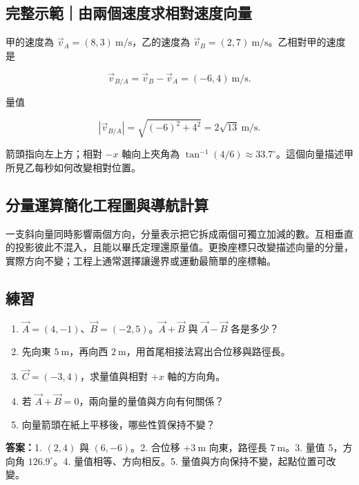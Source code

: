 \documentclass[11pt,a4paper]{article}
\providecommand{\tightlist}{%
  \setlength{\itemsep}{0pt}\setlength{\parskip}{0pt}}
\begin{document}
\begin{HandoutWorkedExample}

\subsection{完整示範｜由兩個速度求相對速度向量}\label{ux5b8cux6574ux793aux7bc4ux7531ux5169ux500bux901fux5ea6ux6c42ux76f8ux5c0dux901fux5ea6ux5411ux91cf}

甲的速度為 \(\vec v_A=(8,3)\ \mathrm{m/s}\)，乙的速度為 \(\vec v_B=(2,7)\ \mathrm{m/s}\)。乙相對甲的速度是

\[
\vec v_{B/A}=\vec v_B-\vec v_A=(-6,4)\ \mathrm{m/s}.
\]

量值

\[
|\vec v_{B/A}|=\sqrt{(-6)^2+4^2}=2\sqrt{13}\ \mathrm{m/s}.
\]

箭頭指向左上方；相對 \(-x\) 軸向上夾角為 \(\tan^{-1}(4/6)\approx33.7^\circ\)。這個向量描述甲所見乙每秒如何改變相對位置。

\end{HandoutWorkedExample}

\subsection{分量運算簡化工程圖與導航計算}\label{ux5206ux91cfux904bux7b97ux7c21ux5316ux5de5ux7a0bux5716ux8207ux5c0eux822aux8a08ux7b97}

一支斜向量同時影響兩個方向，分量表示把它拆成兩個可獨立加減的數。互相垂直的投影彼此不混入，且能以畢氏定理還原量值。更換座標只改變描述向量的分量，實際方向不變；工程上通常選擇讓邊界或運動最簡單的座標軸。

\begin{HandoutSelfCheck}

\subsection{練習}\label{ux7df4ux7fd2-1}

\begin{enumerate}
\def\labelenumi{\arabic{enumi}.}
\tightlist
\item
  \(\vec A=(4,-1)\)、\(\vec B=(-2,5)\)。\(\vec A+\vec B\) 與 \(\vec A-\vec B\) 各是多少？
\item
  先向東 \(5\ \mathrm m\)，再向西 \(2\ \mathrm m\)，用首尾相接法寫出合位移與路徑長。
\item
  \(\vec C=(-3,4)\)，求量值與相對 \(+x\) 軸的方向角。
\item
  若 \(\vec A+\vec B=0\)，兩向量的量值與方向有何關係？
\item
  向量箭頭在紙上平移後，哪些性質保持不變？
\end{enumerate}

\textbf{答案：}1. \((2,4)\) 與 \((6,-6)\)。2. 合位移 \(+3\ \mathrm m\) 向東，路徑長 \(7\ \mathrm m\)。3. 量值 5，方向角 \(126.9^\circ\)。4. 量值相等、方向相反。5. 量值與方向保持不變，起點位置可改變。

\end{HandoutSelfCheck}
\end{document}
